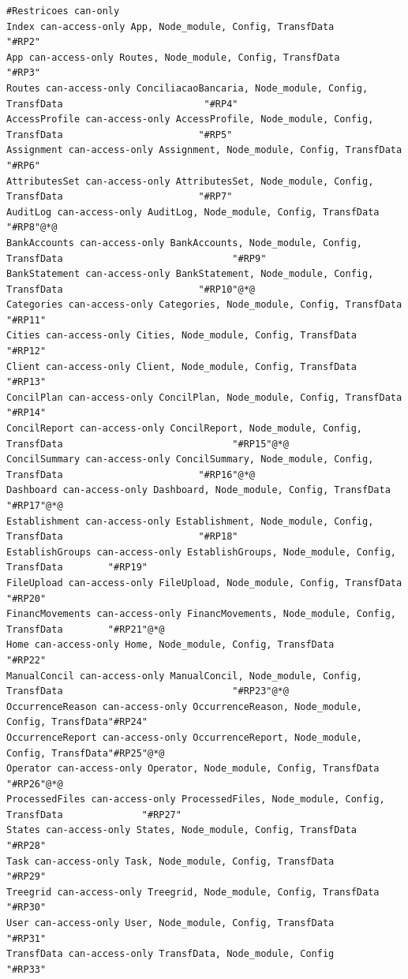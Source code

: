\documentclass[12pt]{article}
\begin{document}
\begin{lstlisting}[style=colorido, caption={Especificação do Projeto Arquitetural do orquestrador Node-Middle.},label={list:especArquiteturalNodeMiddle}
]
#Restricoes can-only
Index can-access-only App, Node_module, Config, TransfData 																							"#RP2"
App can-access-only Routes, Node_module, Config, TransfData																							"#RP3"
Routes can-access-only ConciliacaoBancaria, Node_module, Config, TransfData							"#RP4"
AccessProfile can-access-only AccessProfile, Node_module, Config, TransfData						"#RP5"
Assignment can-access-only Assignment, Node_module, Config, TransfData												"#RP6"
AttributesSet can-access-only AttributesSet, Node_module, Config, TransfData						"#RP7"
AuditLog can-access-only AuditLog, Node_module, Config, TransfData																"#RP8"@*@
BankAccounts can-access-only BankAccounts, Node_module, Config, TransfData								"#RP9"
BankStatement can-access-only BankStatement, Node_module, Config, TransfData						"#RP10"@*@
Categories can-access-only Categories, Node_module, Config, TransfData												"#RP11"
Cities can-access-only Cities, Node_module, Config, TransfData																				"#RP12"
Client can-access-only Client, Node_module, Config, TransfData																				"#RP13"
ConcilPlan can-access-only ConcilPlan, Node_module, Config, TransfData												"#RP14"
ConcilReport can-access-only ConcilReport, Node_module, Config, TransfData								"#RP15"@*@
ConcilSummary can-access-only ConcilSummary, Node_module, Config, TransfData						"#RP16"@*@
Dashboard can-access-only Dashboard, Node_module, Config, TransfData														"#RP17"@*@
Establishment can-access-only Establishment, Node_module, Config, TransfData						"#RP18"
EstablishGroups can-access-only EstablishGroups, Node_module, Config, TransfData		"#RP19"
FileUpload can-access-only FileUpload, Node_module, Config, TransfData												"#RP20"
FinancMovements can-access-only FinancMovements, Node_module, Config, TransfData		"#RP21"@*@
Home can-access-only Home, Node_module, Config, TransfData																								"#RP22"
ManualConcil can-access-only ManualConcil, Node_module, Config, TransfData								"#RP23"@*@
OccurrenceReason can-access-only OccurrenceReason, Node_module, Config, TransfData"#RP24"
OccurrenceReport can-access-only OccurrenceReport, Node_module, Config, TransfData"#RP25"@*@
Operator can-access-only Operator, Node_module, Config, TransfData																"#RP26"@*@
ProcessedFiles can-access-only ProcessedFiles, Node_module, Config, TransfData				"#RP27"
States can-access-only States, Node_module, Config, TransfData																				"#RP28"
Task can-access-only Task, Node_module, Config, TransfData																								"#RP29"
Treegrid can-access-only Treegrid, Node_module, Config, TransfData																"#RP30"
User can-access-only User, Node_module, Config, TransfData																								"#RP31"
TransfData can-access-only TransfData, Node_module, Config																								"#RP33"


\end{lstlisting}
\end{document}
